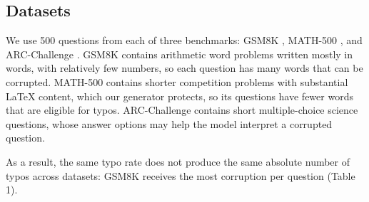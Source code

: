 \documentclass[11pt]{article}
\begin{document}
\subsection{Datasets}
We use 500 questions from each of three benchmarks: GSM8K \citep{cobbe2021}, MATH-500 \citep{hendrycks2021,lightman2024}, and ARC-Challenge \citep{clark2018}. GSM8K contains arithmetic word problems written mostly in words, with relatively few numbers, so each question has many words that can be corrupted. MATH-500 contains shorter competition problems with substantial LaTeX content, which our generator protects, so its questions have fewer words that are eligible for typos. ARC-Challenge contains short multiple-choice science questions, whose answer options may help the model interpret a corrupted question.

As a result, the same typo rate does not produce the same absolute number of typos across datasets: GSM8K receives the most corruption per question (Table 1).
\begin{table}[t]
\centering
\small
{}
\caption{Dataset and corruption statistics over the nine corrupted conditions (r $\in$ \{25, 50, 75\}\%, $\rho$ $\in$ \{10, 40, 70\}\%), first 500 questions of GSM8K and ARC-Challenge and all of MATH-500. \emph{Eligible words} are those the generator may corrupt, after protected spans, single-character words and function words are removed; the typo rate applies to them, and real-word ratios are pooled over all corrupted words.}
\label{tab:1}
\end{table}
\end{document}
